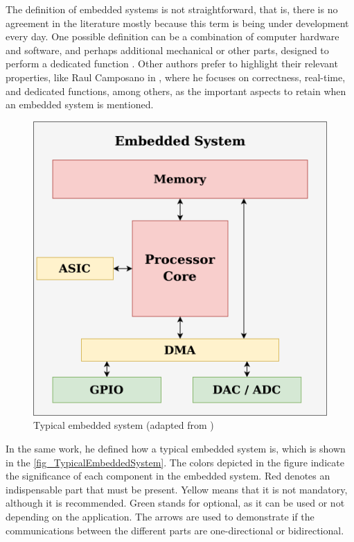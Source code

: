 The definition of embedded systems is not straightforward, that is, there is no agreement in the literature mostly because this term is being 
under development every day. One possible definition can be a combination of computer hardware and software, and perhaps additional mechanical 
or other parts, designed to perform a dedicated function \cite{EmbeddedSystemsGlossary}. Other authors prefer to highlight their relevant 
properties, like Raul Camposano in \cite{camposano1996embedded}, where he focuses on correctness, real-time, and dedicated functions, among 
others, as the important aspects to retain when an embedded system is mentioned. 

\begin{figure}[H]
	\centering
 	\includegraphics[width=0.6\linewidth]{Images/TypicalEmbeddedSystem.png}
 	\caption{Typical embedded system (adapted from \cite{camposano1996embedded})}
	 \label{fig_TypicalEmbeddedSystem}
\end{figure}

In the same work, he defined how a typical embedded system is, which is shown in the \autoref{fig_TypicalEmbeddedSystem}. The colors depicted 
in the figure indicate the significance of each component in the embedded system. Red denotes an indispensable part that must be present. Yellow 
means that it is not mandatory, although it is recommended. Green stands for optional, as it can be used or not depending on the application. The 
arrows are used to demonstrate if the communications between the different parts are one-directional or bidirectional. 

